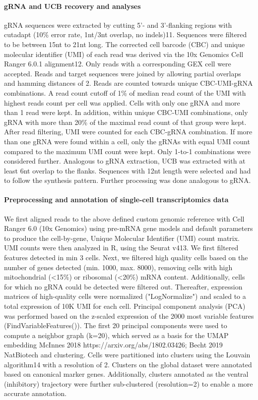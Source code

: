 \paragraph{gRNA and UCB recovery and analyses}
gRNA sequences were extracted by cutting 5'- and 3'-flanking regions with cutadapt (10\% error rate, 1nt/3nt overlap, no indels)11. Sequences were filtered to be between 15nt to 21nt long. The corrected cell barcode (CBC) and unique molecular identifier (UMI) of each read was derived via the 10x Genomics Cell Ranger 6.0.1 alignment12. Only reads with a corresponding GEX cell were accepted. Reads and target sequences were joined by allowing partial overlaps and hamming distances of 2. Reads are counted towards unique CBC-UMI-gRNA combinations. A read count cutoff of 1\% of median read count of the UMI with highest reads count per cell was applied. Cells with only one gRNA and more than 1 read were kept. In addition, within unique CBC-UMI combinations, only gRNA with more than 20\% of the maximal read count of that group were kept. After read filtering, UMI were counted for each CBC-gRNA combination. If more than one gRNA were found within a cell, only the gRNAs with equal UMI count compared to the maximum UMI count were kept. Only 1-to-1 combinations were considered further. Analogous to gRNA extraction, UCB was extracted with at least 6nt overlap to the flanks. Sequences with 12nt length were selected and had to follow the synthesis pattern. Further processing was done analogous to gRNA.


\paragraph{Preprocessing and annotation of single-cell transcriptomics data}
We first aligned reads to the above defined custom genomic reference with Cell Ranger 6.0 (10x Genomics) using pre-mRNA gene models and default parameters to produce the cell-by-gene, Unique Molecular Identifier (UMI) count matrix. UMI counts were then analyzed in R, using the Seurat v413. We first filtered features detected in min 3 cells. Next, we filtered high quality cells based on the number of genes detected (min. 1000, max. 8000), removing cells with high mitochondrial (<15\%) or ribosomal (<20\%) mRNA content. Additionally, cells for which no gRNA could be detected were filtered out. Thereafter, expression matrices of high-quality cells were normalized ("LogNormalize") and scaled to a total expression of 10K UMI for each cell. Principal component analysis (PCA) was performed based on the z-scaled expression of the 2000 most variable features (FindVariableFeatures()). The first 20 principal components were used to compute a neighbor graph (k=20), which served as a basis for the UMAP embedding {McInnes 2018 https://arxiv.org/abs/1802.03426; Becht 2019 NatBiotech} and clustering. Cells were partitioned into clusters using the Louvain algorithm14 with a resolution of 2. Clusters on the global dataset were annotated based on canonical marker genes. Additionally, clusters annotated as the ventral (inhibitory) trajectory were further sub-clustered (resolution=2) to enable a more accurate annotation. 

